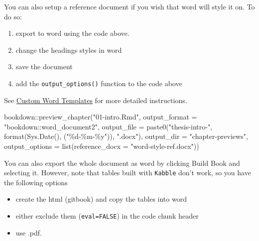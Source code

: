 \documentclass[
  12pt,
  oneside]{book}
\newenvironment{Shaded}{\begin{snugshade}}{\end{snugshade}}
\newcommand{\AttributeTok}[1]{\textcolor[rgb]{0.77,0.63,0.00}{#1}}
\newcommand{\FunctionTok}[1]{\textcolor[rgb]{0.00,0.00,0.00}{#1}}
\newcommand{\NormalTok}[1]{#1}
\newcommand{\SpecialCharTok}[1]{\textcolor[rgb]{0.00,0.00,0.00}{#1}}
\newcommand{\StringTok}[1]{\textcolor[rgb]{0.31,0.60,0.02}{#1}}
\providecommand{\tightlist}{%
  \setlength{\itemsep}{0pt}\setlength{\parskip}{0pt}}
\begin{document}
You can also setup a reference document if you wish that word will style it on. To do so:

\begin{enumerate}
\def\labelenumi{\arabic{enumi}.}
\tightlist
\item
  export to word using the code above.
\item
  change the headings styles in word
\item
  save the document
\item
  add the \texttt{output\_options()} function to the code above
\end{enumerate}

See \href{https://bookdown.org/yihui/rmarkdown-cookbook/word-template.html}{Custom Word Templates} for more detailed instructions.

\begin{Shaded}
\begin{Highlighting}[]
\NormalTok{bookdown}\SpecialCharTok{::}\FunctionTok{preview\_chapter}\NormalTok{(}\StringTok{"01{-}intro.Rmd"}\NormalTok{,}
                \AttributeTok{output\_format =} \StringTok{"bookdown::word\_document2"}\NormalTok{,}
                \AttributeTok{output\_file =} \FunctionTok{paste0}\NormalTok{(}\StringTok{"thesis{-}intro{-}"}\NormalTok{, }
                                     \FunctionTok{format}\NormalTok{(}\FunctionTok{Sys.Date}\NormalTok{(), }
\NormalTok{                                            (}\StringTok{"\%d{-}\%m{-}\%y"}\NormalTok{)), }
                                     \StringTok{".docx"}\NormalTok{),}
                \AttributeTok{output\_dir =} \StringTok{"chapter{-}previews"}\NormalTok{,}
                \AttributeTok{output\_options =} \FunctionTok{list}\NormalTok{(}\AttributeTok{reference\_docx =} \StringTok{"word{-}style{-}ref.docx"}\NormalTok{))}
\end{Highlighting}
\end{Shaded}

You can also export the whole document as word by clicking Build Book and selecting it. However, note that tables built with \texttt{Kabble} don't work, so you have the following options

\begin{itemize}
\tightlist
\item
  create the html (gitbook) and copy the tables into word
\item
  either exclude them (\texttt{eval=FALSE}) in the code chunk header
\item
  use .pdf.
\end{itemize}
\end{document}
